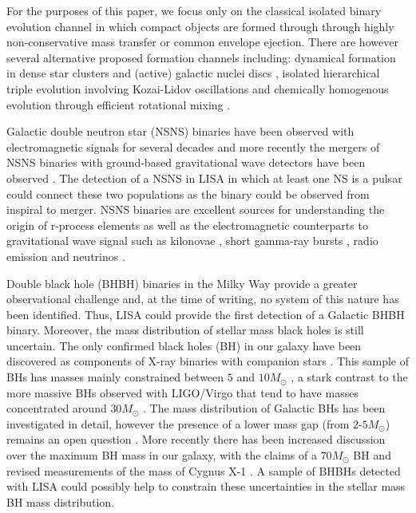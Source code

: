For the purposes of this paper, we focus only on the classical isolated binary evolution channel \citep[e.g.][]{Tutukov+1973,Tutukov+1993,Kalogera+2007,Belczynski+2016} in which compact objects are formed through through highly non-conservative mass transfer or common envelope ejection. There are however several alternative proposed formation channels including: dynamical formation in dense star clusters \citep[e.g.][]{Sigurdsson+1993,PortegiesZwart+2000,Miller+2009,Rodriguez+2015} and (active) galactic nuclei discs \citep[e.g.][]{Morris+1993, Antonini+2016, McKernan+2020}, isolated hierarchical triple evolution involving Kozai-Lidov oscillations \citep[e.g.][]{Stephan+2016, Silsbee+2017,Antonini+2017} and chemically homogenous evolution through efficient rotational mixing \citep[e.g.][]{deMink+2009, deMink+2016,Marchant+2016,duBuisson+2020}.

Galactic double neutron star (NSNS) binaries have been observed with electromagnetic signals for several decades \citep[e.g.][]{Hulse+1975} and more recently the mergers of NSNS binaries with ground-based gravitational wave detectors have been observed \citep[e.g.][]{Abbott+2017_NSNS}. The detection of a NSNS in LISA in which at least one NS is a pulsar could connect these two populations as the binary could be observed from inspiral to merger. NSNS binaries are excellent sources for understanding the origin of r-process elements \citep[e.g.][]{Eichler+1989} as well as the electromagnetic counterparts to gravitational wave signal such as kilonovae \citep[e.g.][]{Metzger+2017}, short gamma-ray bursts \citep[e.g.][]{Gompertz+2020}, radio emission \citep[e.g.][]{Hotokezaka+2016} and neutrinos \citep[e.g.][]{Kyutoku+2018}.

Double black hole (BHBH) binaries in the Milky Way provide a greater observational challenge and, at the time of writing, no system of this nature has been identified. Thus, LISA could provide the first detection of a Galactic BHBH binary. Moreover, the mass distribution of stellar mass black holes is still uncertain. The only confirmed black holes (BH) in our galaxy have been discovered as components of X-ray binaries with companion stars \citep[e.g.][]{Bolton+1972,Webster+1972}. This sample of BHs has masses mainly constrained between $5$ and $10 \unit{M_\odot}$ \citep{Corral-Santana+2016}, a stark contrast to the more massive BHs observed with LIGO/Virgo that tend to have masses concentrated around $30 \unit{M_{\odot}}$ \citep{Abbott+2020_GWTC2}. The mass distribution of Galactic BHs has been investigated in detail, however the presence of a lower mass gap (from $2$-$5 \unit{M_{\odot}}$) remains an open question \citep[e.g.][]{Ozel+2010,Farr+2011}. More recently there has been increased discussion over the maximum BH mass in our galaxy, with the claims of a $70 \unit{M_{\odot}}$ BH \citep{Liu+2019,Abdul-Masih+2020} and revised measurements of the mass of Cygnus X-1 \citep{Miller-Jones+2021}. A sample of BHBHs detected with LISA could possibly help to constrain these uncertainties in the stellar mass BH mass distribution.

